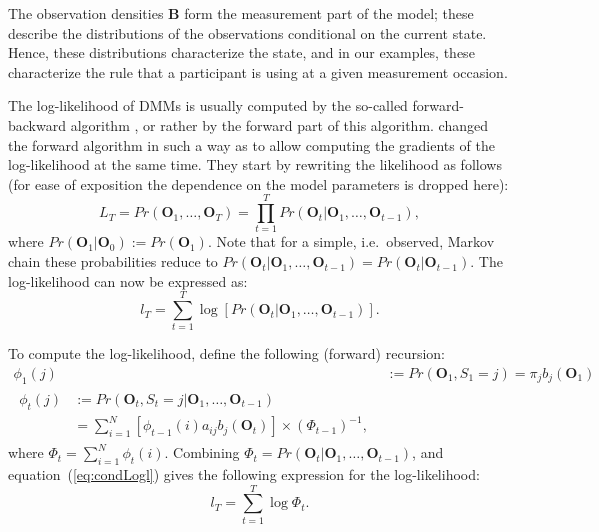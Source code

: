 \documentclass[a4paper,12pt,man]{apa} %
\newcommand{\citep}{\cite}
\newcommand{\citet}{\citeA}
\newcommand{\mat}{\mathbf}
\newcommand{\vc}{\mathbf}
\begin{document}
The observation densities $\mat{B}$ form the measurement part of the
model; these describe the distributions of the observations
conditional on the current state. Hence, these distributions
characterize the state, and in our examples, these characterize the
rule that a participant is using at a given measurement occasion.

The log-likelihood of DMMs is usually computed by the
so-called forward-backward algorithm \citep{Baum1966,Rabiner1989}, or
rather by the forward part of this algorithm.  \citet{Lystig2002}
changed the forward algorithm in such a way as to allow computing the
gradients of the log-likelihood at the same time.  They start by
rewriting the likelihood as follows (for ease of exposition the
dependence on the model parameters is dropped here):
\begin{equation}
	L_{T} = Pr(\vc{O}_{1}, \ldots, \vc{O}_{T}) = \prod_{t=1}^{T}
Pr(\vc{O}_{t}|\vc{O}_{1},
	\ldots, \vc{O}_{t-1}),
	\label{condLike}
\end{equation}
where $Pr(\vc{O}_{1}|\vc{O}_{0}):=Pr(\vc{O}_{1})$. Note that for a
simple, i.e.\ observed, Markov chain these probabilities reduce to
$Pr(\vc{O}_{t}|\vc{O}_{1},\ldots,
\vc{O}_{t-1})=Pr(\vc{O}_{t}|\vc{O}_{t-1})$.
The log-likelihood can now be expressed as:
\begin{equation}
	l_{T} = \sum_{t=1}^{T} \log[Pr(\vc{O}_{t}|\vc{O}_{1}, \ldots,
\vc{O}_{t-1})].
	\label{eq:condLogl}
\end{equation}

To compute the log-likelihood, \citet{Lystig2002} define the following
(forward) recursion:
\begin{align}
	\phi_{1}(j) &:= Pr(\vc{O}_{1}, S_{1}=j) = \pi_{j} b_{j}(\vc{O}_{1})
	\label{eq:fwd1} \\
\begin{split}
	\phi_{t}(j) &:= Pr(\vc{O}_{t}, S_{t}=j|\vc{O}_{1}, \ldots,
\vc{O}_{t-1}) \\
	&= \sum_{i=1}^{N} [\phi_{t-1}(i)a_{ij}b_{j}(\vc{O}_{t})] \times
(\Phi_{t-1})^{-1},
	\label{eq:fwdt}
\end{split}
\end{align}
where $\Phi_{t}=\sum_{i=1}^{N} \phi_{t}(i)$. Combining
$\Phi_{t}=Pr(\vc{O}_{t}|\vc{O}_{1}, \ldots, \vc{O}_{t-1})$, and
equation~(\ref{eq:condLogl}) gives the following expression for the
log-likelihood:
\begin{equation}
	l_{T} = \sum_{t=1}^{T} \log \Phi_{t}.
	\label{eq:logl}
\end{equation}
\end{document}
